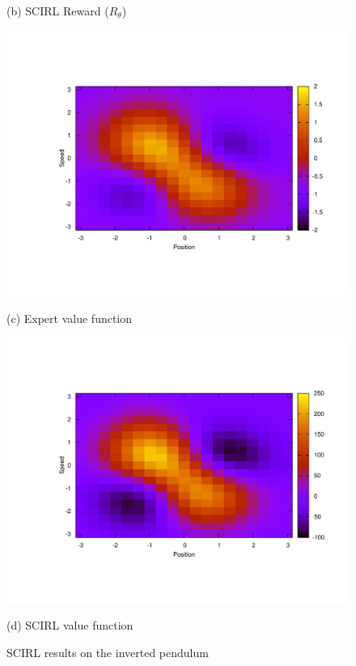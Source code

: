 \documentclass{article}
\begin{document}
\begin{figure}[ht]
\begin{center}
\begin{minipage}[b]{.48\linewidth}
  \centerline{(b) SCIRL Reward ($R_\theta$)}%
\end{minipage}
\begin{minipage}[b]{.48\linewidth}
  \centering
  \centerline{\includegraphics[width=\columnwidth]{LAFEM_Exp3_Vexpert.pdf}}
  \centerline{(c) Expert value function}%
\end{minipage}
\hfill
\begin{minipage}[b]{.48\linewidth}
  \centering
  \centerline{\includegraphics[width=\columnwidth]{LAFEM_Exp3_Vagent.pdf}}
  \centerline{(d) SCIRL value function}%
\end{minipage}
%
\caption{SCIRL results on the inverted pendulum} \label{onlyFig.fig}
%
\end{center}
\vskip -0.2in
\end{figure}
\end{document}
